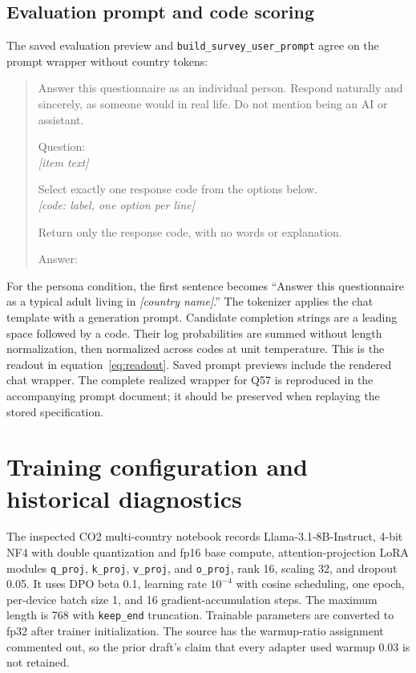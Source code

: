 \subsection{Evaluation prompt and code scoring}
The saved evaluation preview and \texttt{build\_survey\_user\_prompt} agree on the prompt wrapper without country tokens:
\begin{quote}\small
Answer this questionnaire as an individual person. Respond naturally and sincerely, as someone would in real life. Do not mention being an AI or assistant.

Question:\\
\emph{[item text]}

Select exactly one response code from the options below.\\
\emph{[code: label, one option per line]}

Return only the response code, with no words or explanation.

Answer:
\end{quote}
For the persona condition, the first sentence becomes ``Answer this questionnaire as a typical adult living in \emph{[country name]}.'' The tokenizer applies the chat template with a generation prompt. Candidate completion strings are a leading space followed by a code. Their log probabilities are summed without length normalization, then normalized across codes at unit temperature. This is the readout in equation~\eqref{eq:readout}. Saved prompt previews include the rendered chat wrapper. The complete realized wrapper for Q57 is reproduced in the accompanying prompt document; it should be preserved when replaying the stored specification.

\section{Training configuration and historical diagnostics}\label{app:training}
The inspected CO2 multi-country notebook records Llama-3.1-8B-Instruct, 4-bit NF4 with double quantization and fp16 base compute, attention-projection LoRA modules \texttt{q\_proj}, \texttt{k\_proj}, \texttt{v\_proj}, and \texttt{o\_proj}, rank 16, scaling 32, and dropout 0.05. It uses DPO beta 0.1, learning rate $10^{-4}$ with cosine scheduling, one epoch, per-device batch size 1, and 16 gradient-accumulation steps. The maximum length is 768 with \texttt{keep\_end} truncation. Trainable parameters are converted to fp32 after trainer initialization. The source has the warmup-ratio assignment commented out, so the prior draft's claim that every adapter used warmup 0.03 is not retained.

